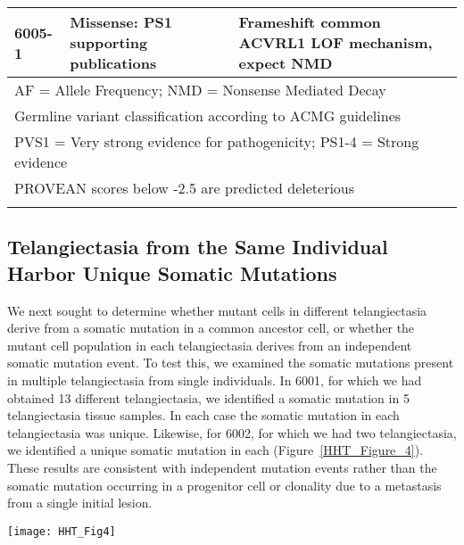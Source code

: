 \begin{table}[]
\begin{tabularx}{\textwidth}{l p{3.6cm} X}
6005-1 & Missense: PS1 \newline 16 supporting publications & Frameshift \newline common ACVRL1 LOF mechanism, expect NMD \\
\bottomrule
\multicolumn{3}{l}{\scriptsize{AF = Allele Frequency; NMD = Nonsense Mediated Decay}} \\
\multicolumn{3}{l}{\scriptsize{Germline variant classification according to ACMG guidelines \citep{richards2015}}} \\
\multicolumn{3}{l}{\scriptsize{PVS1 = Very strong evidence for pathogenicity; PS1-4 = Strong evidence}} \\
\multicolumn{3}{l}{\scriptsize{PROVEAN scores below -2.5 are predicted deleterious}} \\
\label{HHT_Table_3}
\end{tabularx}

\end{table}

\subsection{Telangiectasia from the Same Individual Harbor Unique Somatic Mutations}
We next sought to determine whether mutant cells in different telangiectasia derive from a somatic mutation in a common ancestor cell, or whether the mutant cell population in each telangiectasia derives from an independent somatic mutation event. To test this, we examined the somatic mutations present in multiple telangiectasia from single individuals. In 6001, for which we had obtained 13 different telangiectasia, we identified a somatic mutation in 5 telangiectasia tissue samples.  In each case the somatic mutation in each telangiectasia was unique. Likewise, for 6002, for which we had two telangiectasia, we identified a unique somatic mutation in each (Figure~\ref{HHT_Figure_4}). These results are consistent with independent mutation events rather than the somatic mutation occurring in a progenitor cell or clonality due to a metastasis from a single initial lesion. 

\begin{sidewaysfigure}[tbp!]
\begin{center}
\texttt{[image: HHT\_Fig4]}
\end{center}

\caption[Each Telangiectasia is Seeded by a Unique Somatic Mutation]{Schematic representation of exons in  and  with germline and somatic mutations identified in (\textbf{A}) 5 telangiectasia collected from 6001 and (\textbf{B}) 2 telangiectasia collected from 6002. In each panel the common germline mutation is listed above the gene and somatic mutations in each telangiectasia below the gene. Gene structure and mutation position are drawn to scale. }

\label{HHT_Figure_4}
\end{sidewaysfigure}

